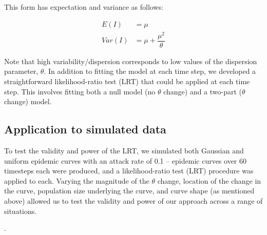 \documentclass[10pt,letterpaper]{article}
\begin{document}
This form has expectation and variance as follows:

\begin{align}
  E(I) &= \mu\\
  Var(I) &= \mu + \dfrac{\mu^2}{\theta}
\end{align}

\noindent Note that high variability/dispersion corresponds to low values of the dispersion parameter, \begin{math}\theta\end{math}.
\noindent In addition to fitting the model at each time step, we developed a straightforward likelihood-ratio test (LRT) that could be applied at each time step. This involves fitting both a null model (no \begin{math}\theta\end{math} change) and a two-part (\begin{math}\theta\end{math} change) model.

\subsection*{Application to simulated data}

To test the validity and power of the LRT, we simulated both Gaussian and uniform epidemic curves with an attack rate of 0.1 -- epidemic curves over 60 timesteps each were produced, and a likelihood-ratio test (LRT) procedure was applied to each. 
Varying the magnitude of the \begin{math}\theta\end{math} change, location of the change in the curve, population size underlying the curve, and curve shape (as mentioned above) allowed us to test the validity and power of our approach across a range of situations.

.
\end{document}
